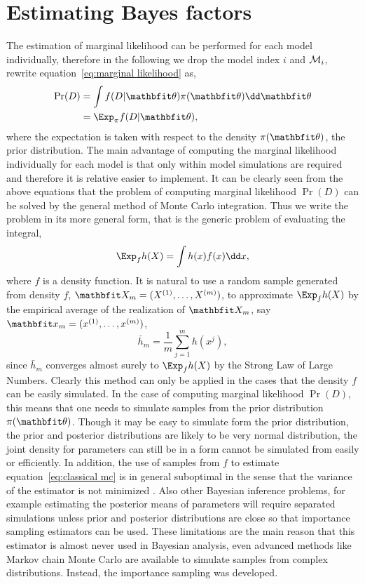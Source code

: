 \section{Estimating Bayes factors}
\label{sec:Estimating Bayes factors}

The estimation of marginal likelihood can be performed for each model
individually, therefore in the following we drop the model index $i$ and
$\mathcal{M}_i$, rewrite equation~\eqref{eq:marginal likelihood} as,
\begin{align}
  \Pr(D) & = \int f(D|\bth)\pi(\bth)\dd\bth \\
  & = \Exp_{\pi} f(D|\bth),
\end{align}
where the expectation is taken with respect to the density $\pi(\bth)$, the
prior distribution. The main advantage of computing the marginal likelihood
individually for each model is that only within model simulations are required
and therefore it is relative easier to implement. It can be clearly seen from
the above equations that the problem of computing marginal likelihood $\Pr(D)$
can be solved by the general method of Monte Carlo integration. Thus we write
the problem in its more general form, that is the generic problem of
evaluating the integral,
\begin{equation}
  \Exp_f h(X) = \int h(x) f(x)
  \dd x,
  \label{eq:classical mc}
\end{equation}
where $f$ is a density function. It is natural to use a random sample
generated from density $f$, $\bfX_m = (X^{(1)},\dots,X^{(m)})$, to
approximate $\Exp_f h(X)$ by the empirical average of the realization of
$\bfX_m$, say $\bfx_m = (x^{(1)},\dots,x^{(m)})$,
\begin{equation}
  \bar{h}_m = \frac{1}{m}\sum_{j=1}^m h(x^j),
  \label{eq:is convergence}
\end{equation}
since $\bar{h}_m$ converges almost surely to $\Exp_f h(X)$ by the Strong Law
of Large Numbers. Clearly this method can only be applied in the cases that
the density $f$ can be easily simulated. In the case of computing marginal
likelihood $\Pr(D)$, this means that one needs to simulate samples from the
prior distribution $\pi(\bth)$. Though it may be easy to simulate form the
prior distribution, the prior and posterior distributions are likely to be
very normal distribution, the joint density for parameters can still be in a
form cannot be simulated from easily or efficiently. In addition, the use of
samples from $f$ to estimate equation~\eqref{eq:classical mc} is in general
suboptimal in the sense that the variance of the estimator is not minimized
\parencite[see][sec.~3.3]{Robert2004}. Also other Bayesian inference problems,
for example estimating the posterior means of parameters will require
separated simulations unless prior and posterior distributions are close so
that importance sampling estimators can be used. These limitations are the
main reason that this estimator is almost never used in Bayesian analysis,
even advanced methods like Markov chain Monte Carlo are available to simulate
samples from complex distributions. Instead, the importance sampling was
developed.

